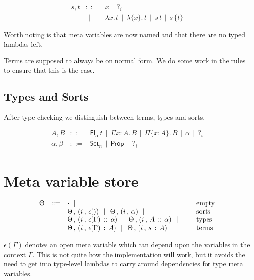 \documentclass[a4paper,11pt]{article}
\newcommand\Coloneqq{\mathrel{::=}}
\newcommand\OR{~~|~~}
\newcommand\Hid[1]{\{#1\}}
\newcommand\lam[1]{\lambda#1.\,}
\newcommand\hlam[1]{\lam{\Hid{#1}}}
\newcommand\vPi[2]{\Pi#1:#2.\,}
\newcommand\vhPi[2]{\Pi\{#1:#2\}.\,}
\newcommand\Set[1]{\mathsf{Set}_{#1}}
\newcommand\Prop{\mathsf{Prop}}
\newcommand\el{\mathsf{El}}
\newcommand\El[1]{\el_{#1}\,}
\newcommand\openV[1]{\epsilon(#1)}
\newcommand\sortV[2]{(#1\,,\, #2)}
\newcommand\typeV[3]{(#1\,,\, #2 \,::\,#3)}
\newcommand\termV[3]{(#1\,,\, #2\,:\,#3)}
\begin{document}
    \[\begin{array}{lcl}
        s,t & \Coloneqq & x \OR ?_i \\
            & \OR & \lam xt \OR \hlam xt \OR s\,t \OR s\,\Hid t
    \end{array}\]

    Worth noting is that meta variables are now named and that there are no
    typed lambdas left.

    Terms are supposed to always be on normal form. We do some work in the
    rules to ensure that this is the case.

\subsection{Types and Sorts}

    After type checking we distinguish between terms, types and sorts.

    \[\begin{array}{lcl}
        A,B & \Coloneqq & \El\alpha t \OR \vPi xAB \OR \vhPi xAB \OR \alpha \OR ?_i\\
        \alpha,\beta & \Coloneqq & \Set n \OR \Prop \OR ?_i\\
    \end{array}\]


\section{Meta variable store}

    \[\begin{array}{lcl@{\qquad}l}
        \Theta & \Coloneqq & \cdot \OR & \mbox{empty} \\
        && \Theta\,,\,\sortV i{\openV {}} \OR \Theta\,,\,\sortV i\alpha \OR & \mbox{sorts}\\
        && \Theta\,,\,\typeV i{\openV \Gamma} \alpha \OR \Theta\,,\,\typeV iA\alpha \OR & \mbox{types}\\
        && \Theta\,,\,\termV i{\openV \Gamma} A \OR \Theta\,,\,\termV isA & \mbox{terms}\\
    \end{array}\]
    
    $\openV \Gamma$ denotes an open meta variable which can depend
    upon the variables in the context $\Gamma$. This is not quite how
    the implementation will work, but it avoids the need to get into
    type-level lambdas to carry around dependencies for type meta
    variables.
\end{document}
